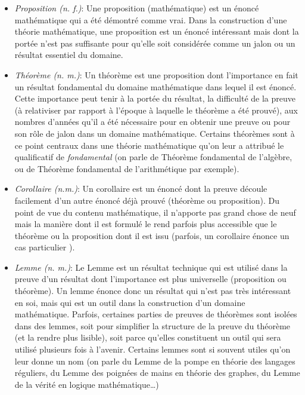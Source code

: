 \documentclass[french,course,oneside,theoremnosection]{lecture}
\begin{document}
\begin{itemize}%

\item \emph{Proposition (n. f.)}: Une proposition (mathématique) est un énoncé mathématique qui a été démontré comme vrai. Dans la construction d'une théorie mathématique, une proposition est un énoncé intéressant mais dont la portée n'est pas suffisante pour qu'elle soit considérée comme un jalon ou un résultat essentiel du domaine.

\item \emph{Théorème (n. m.)}: Un théorème est  une proposition dont l'importance en fait un résultat fondamental du domaine mathématique dans lequel il est énoncé. Cette importance peut tenir à la portée du résultat, la difficulté de la preuve (à relativiser par rapport à l'époque à laquelle le théorème a été prouvé), aux nombres d'années qu'il a été nécessaire pour en obtenir une preuve ou pour son rôle de jalon dans un domaine mathématique. Certains théorèmes sont à ce point centraux dans une théorie mathématique qu'on leur a attribué le qualificatif de \emph{fondamental} (on parle de Théorème fondamental de l'algèbre, ou de Théorème fondamental de l'arithmétique par exemple).

\item \emph{Corollaire (n.m.)}: Un corollaire est un énoncé dont la preuve découle facilement d'un autre énoncé déjà prouvé (théorème ou proposition). Du point de vue du contenu mathématique, il n'apporte pas grand chose de neuf mais la manière dont il est formulé le rend parfois plus accessible que le théorème ou la proposition dont il est issu (parfois, un corollaire énonce un cas particulier ).

\item \emph{Lemme (n. m.)}: Le Lemme est un résultat technique qui est utilisé dans la preuve d'un résultat dont l'importance est plus universelle (proposition ou théorème). Un lemme énonce donc un résultat qui n'est pas très intéressant en soi, mais qui est un outil dans la construction d'un domaine mathématique. Parfois, certaines parties de preuves de théorèmes sont isolées dans des lemmes, soit pour simplifier la structure de la preuve du théorème (et la rendre plus lisible), soit parce qu'elles constituent un outil qui sera utilisé plusieurs fois à l'avenir. Certains lemmes sont si souvent utiles qu'on leur donne un  nom (on parle du Lemme de la pompe en théorie des langages réguliers, du Lemme des poignées de mains en théorie des graphes, du Lemme de la vérité en logique mathématique\ldots)




\end{itemize}
\end{document}
